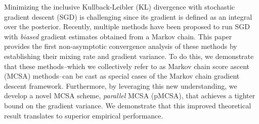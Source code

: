 
Minimizing the inclusive Kullback-Leibler (KL) divergence with stochastic gradient descent (SGD) is challenging since its gradient is defined as an integral over the posterior.
Recently, multiple methods have been proposed to run SGD with \textit{biased} gradient estimates obtained from a Markov chain.
This paper provides the first non-asymptotic convergence analysis of these methods by establishing their mixing rate and gradient variance.
To do this, we demonstrate that these methods--which we collectively refer to as Markov chain score ascent (MCSA) methods--can be cast as special cases of the Markov chain gradient descent framework.
Furthermore, by leveraging this new understanding, we develop a novel MCSA scheme, \textit{parallel} MCSA (pMCSA), that achieves a tighter bound on the gradient variance.
We demonstrate that this improved theoretical result translates to superior empirical performance.



